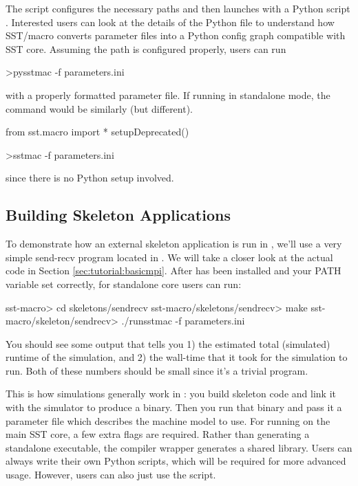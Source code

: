 The script configures the necessary paths and then launches with a Python script .  Interested users can look at the details of the Python file to understand how SST/macro converts parameter files into a Python config graph compatible with SST core.
Assuming the path is configured properly, users can run

\begin{ShellCmd}
>pysstmac -f parameters.ini
\end{ShellCmd}
with a properly formatted parameter file. If running in standalone mode, the command would be similarly (but different).

\begin{ViFile}
from sst.macro import *
setupDeprecated()
\end{ViFile}

\begin{ShellCmd}
>sstmac -f parameters.ini
\end{ShellCmd}
since there is no Python setup involved.

\subsection{Building Skeleton Applications}
\label{sec:tutorial:runapp}

To demonstrate how an external skeleton application is run in \sstmacro, we'll use a very simple send-recv program located in .
We will take a closer look at the actual code in Section \ref{sec:tutorial:basicmpi}.
After \sstmacro has been installed and your PATH variable set correctly, for standalone core users can run:

\begin{ShellCmd}
sst-macro> cd skeletons/sendrecv
sst-macro/skeletons/sendrecv> make
sst-macro/skeleton/sendrecv> ./runsstmac -f parameters.ini
\end{ShellCmd}

You should see some output that tells you 1) the estimated total (simulated) runtime of the simulation, and 
2) the wall-time that it took for the simulation to run.  
Both of these numbers should be small since it's a trivial program. 

This is how simulations generally work in \sstmacro: you build skeleton code and link it with the simulator to produce a binary.  
Then you run that binary and pass it a parameter file which describes the machine model to use.  For running on the main SST core, a few extra flags are required.  Rather than generating a standalone executable, the compiler wrapper generates a shared library. Users can always write their own Python scripts, which will be required for more advanced usage. However, users can also just use the  script.

